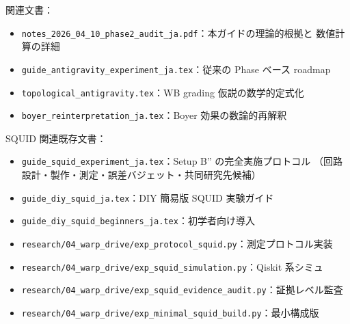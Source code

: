 \documentclass[11pt,a4paper]{article}
\def\textbf#1{#1}%
\begin{document}
\vspace{1em}

\textbf{関連文書}：
\begin{itemize}
\item \texttt{notes\_2026\_04\_10\_phase2\_audit\_ja.pdf}：本ガイドの理論的根拠と
  数値計算の詳細
\item \texttt{guide\_antigravity\_experiment\_ja.tex}：従来の Phase ベース roadmap
\item \texttt{topological\_antigravity.tex}：WB grading 仮説の数学的定式化
\item \texttt{boyer\_reinterpretation\_ja.tex}：Boyer 効果の数論的再解釈
\end{itemize}

\textbf{SQUID 関連既存文書}：
\begin{itemize}
\item \texttt{guide\_squid\_experiment\_ja.tex}：Setup B'' の完全実施プロトコル
  （回路設計・製作・測定・誤差バジェット・共同研究先候補）
\item \texttt{guide\_diy\_squid\_ja.tex}：DIY 簡易版 SQUID 実験ガイド
\item \texttt{guide\_diy\_squid\_beginners\_ja.tex}：初学者向け導入
\item \texttt{research/04\_warp\_drive/exp\_protocol\_squid.py}：測定プロトコル実装
\item \texttt{research/04\_warp\_drive/exp\_squid\_simulation.py}：Qiskit 系シミュ
\item \texttt{research/04\_warp\_drive/exp\_squid\_evidence\_audit.py}：証拠レベル監査
\item \texttt{research/04\_warp\_drive/exp\_minimal\_squid\_build.py}：最小構成版
\end{itemize}
\end{document}
